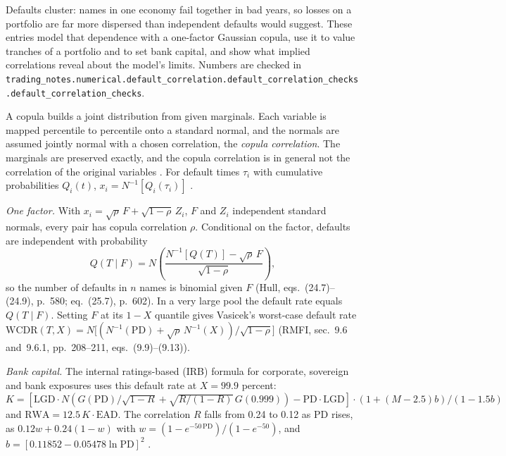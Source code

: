 Defaults cluster: names in one economy fail together in bad years, so losses on a portfolio are far more dispersed than independent defaults would suggest. These entries model that dependence with a one-factor Gaussian copula, use it to value tranches of a portfolio and to set bank capital, and show what implied correlations reveal about the model's limits. Numbers are checked in \nolinkurl{trading_notes.numerical.default_correlation.default_correlation_checks.default_correlation_checks}.

\begin{qfmodel}\label{mod:gaussian-copula-default-correlation}
 A copula builds a joint distribution from given marginals. Each variable is mapped percentile to percentile onto a standard normal, and the normals are assumed jointly normal with a chosen correlation, the \emph{copula correlation}. The marginals are preserved exactly, and the copula correlation is in general not the correlation of the original variables \citep[chap.~9, sec.~9.5, pp.~202--205]{risk-management-financial-institutions-2023}. For default times $\tau_i$ with cumulative probabilities $Q_i(t)$, $x_i=N^{-1}[Q_i(\tau_i)]$ \citep[chap.~24, sec.~24.8, pp.~578--579]{s7-hulloptions}.

\emph{One factor.} With $x_i=\sqrt\rho\,F+\sqrt{1-\rho}\,Z_i$, $F$ and $Z_i$ independent standard normals, every pair has copula correlation $\rho$. Conditional on the factor, defaults are independent with probability
\[ Q(T\mid F)=N\!\left(\frac{N^{-1}[Q(T)]-\sqrt\rho\,F}{\sqrt{1-\rho}}\right), \]
so the number of defaults in $n$ names is binomial given $F$ (Hull, eqs.~(24.7)--(24.9), p.~580; eq.~(25.7), p.~602). In a very large pool the default rate equals $Q(T\mid F)$. Setting $F$ at its $1-X$ quantile gives Vasicek's worst-case default rate $\mathrm{WCDR}(T,X)=N\big[(N^{-1}(\mathrm{PD})+\sqrt\rho\,N^{-1}(X))/\sqrt{1-\rho}\big]$ (RMFI, sec.~9.6 and~9.6.1, pp.~208--211, eqs.~(9.9)--(9.13)).

\emph{Bank capital.} The internal ratings-based (IRB) formula for corporate, sovereign and bank exposures uses this default rate at $X=99.9$ percent: $K=[\mathrm{LGD}\cdot N(G(\mathrm{PD})/\sqrt{1-R}+\sqrt{R/(1-R)}\,G(0.999))-\mathrm{PD}\cdot\mathrm{LGD}]\cdot(1+(M-2.5)b)/(1-1.5b)$ and $\mathrm{RWA}=12.5\,K\cdot\mathrm{EAD}$. The correlation $R$ falls from 0.24 to 0.12 as PD rises, as $0.12w+0.24(1-w)$ with $w=(1-e^{-50\,\mathrm{PD}})/(1-e^{-50})$, and $b=[0.11852-0.05478\ln\mathrm{PD}]^2$ \citep[CRE31.2 and CRE31.5--31.6]{basel-framework-cre-2026}.


\end{qfmodel}
